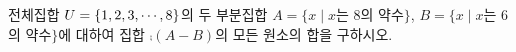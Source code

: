 전체집합 $U=\{1{,}\mkern3mu\mathopen{}2{,}\mkern3mu\mathopen{}3{,}\mkern3mu\mathopen{}\cdots{,}\mkern3mu\mathopen{}8\}$의 두 부분집합 $A=\{x \mid x$는 $8$의 약수$\}$, $B=\{x \mid x$는 $6$의 약수$\}$에 대하여 집합 $\comp{(A-B)}$의 모든 원소의 합을 구하시오.
